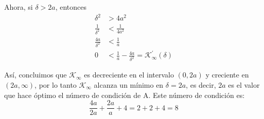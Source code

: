 \begin{enumerate}
\begin{solution}
    Ahora, si $\delta > 2a$, entonces
    \begin{align*}
      \delta^2 &> 4a^2 \\
      \frac{1}{\delta^2} &< \frac{1}{4a^2} \\ 
      \frac{4a}{\delta^2} & < \frac{1}{a} \\    
      0 & < \frac{1}{a}-\frac{4a}{\delta^2} = \mathcal{K}_{\infty}^{\prime}(\delta)
      \end{align*}

    Así, concluimos que $\mathcal{K}_{\infty}$ es decreciente en el intervalo $(0,2a)$ y creciente en $(2a,\infty)$, por lo tanto $\mathcal{K_\infty}$ alcanza un mínimo en $\delta = 2a$, es decir, $2a$ es el valor que hace óptimo el número de condición de A.
    Este número de condición es: 
    \[
    \frac{4a}{2a}+\frac{2a}{a}+4=2+2+4=8
    \]
    \end{solution}
\end{enumerate}